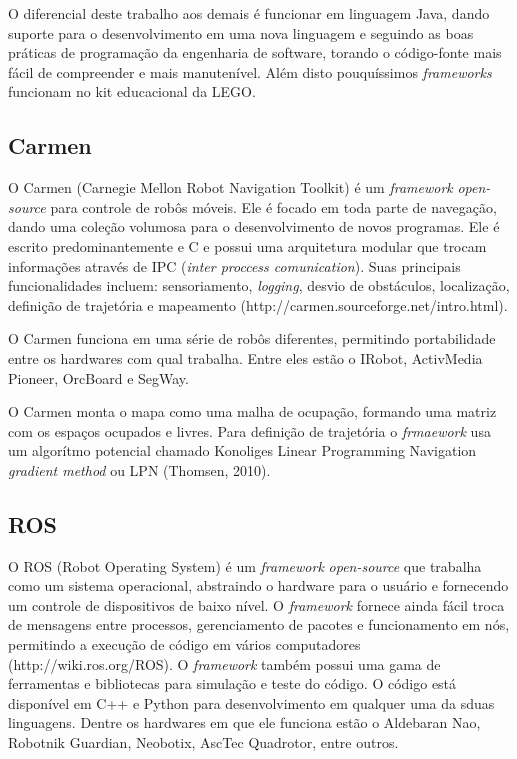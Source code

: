 O diferencial deste trabalho aos demais é funcionar em linguagem Java, dando suporte para o desenvolvimento em uma nova linguagem e seguindo as boas práticas de programação da engenharia de software, torando o código-fonte mais fácil de compreender e mais manutenível. Além disto pouquíssimos \textit{frameworks} funcionam no kit educacional da LEGO.

\subsection{Carmen}

O Carmen (Carnegie Mellon Robot Navigation Toolkit) é um \textit{framework} \textit{open-source} para controle de robôs móveis. Ele é focado em toda parte de navegação, dando uma coleção volumosa para o desenvolvimento de novos programas. Ele é escrito predominantemente e C e possui uma arquitetura modular que trocam informações através de IPC (\textit{inter proccess comunication}). Suas principais funcionalidades incluem: sensoriamento, \textit{logging}, desvio de obstáculos, localização, definição de trajetória e mapeamento (http://carmen.sourceforge.net/intro.html). 

O Carmen funciona em uma série de robôs diferentes, permitindo portabilidade entre os hardwares com qual trabalha. Entre eles estão o IRobot, ActivMedia Pioneer, OrcBoard e SegWay.

O Carmen monta o mapa como uma malha de ocupação, formando uma matriz com os espaços ocupados e livres. Para definição de trajetória o \textit{frmaework} usa um algorítmo potencial chamado Konoliges Linear Programming Navigation \textit{gradient method} ou LPN (Thomsen, 2010).

\subsection{ROS}

O ROS (Robot Operating System) é um \textit{framework} \textit{open-source} que trabalha como um sistema operacional, abstraindo o hardware para o usuário e fornecendo um controle de dispositivos de baixo nível. O \textit{framework} fornece ainda fácil troca de mensagens entre processos, gerenciamento de pacotes e funcionamento em nós, permitindo a execução de código em vários computadores (http://wiki.ros.org/ROS). O \textit{framework} também possui uma gama de ferramentas e bibliotecas para simulação e teste do código. O código está disponível em C++ e Python para desenvolvimento em qualquer uma da sduas linguagens. Dentre os hardwares em que ele funciona estão o Aldebaran Nao, Robotnik Guardian, Neobotix, AscTec Quadrotor, entre outros.

